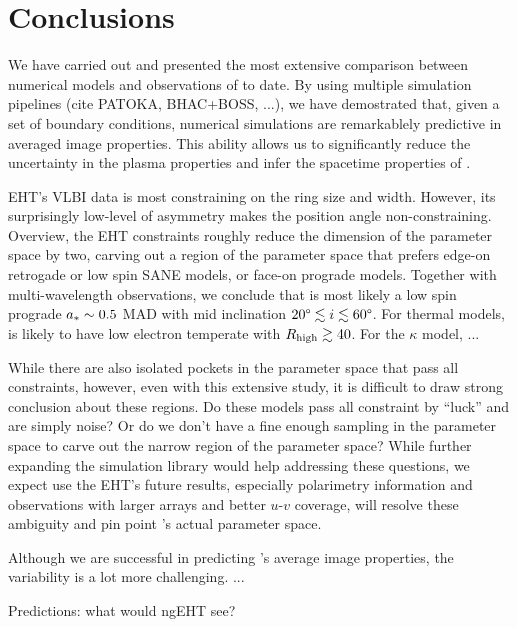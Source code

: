 \section{Conclusions}\label{sec:conclusions}


We have carried out and presented the most extensive comparison
between numerical models and observations of \sgra to date.
By using multiple simulation pipelines (cite PATOKA, BHAC+BOSS, ...),
we have demostrated that, given a set of boundary conditions,
numerical simulations are remarkablely predictive in averaged image
properties.
This ability allows us to significantly reduce the uncertainty in the
plasma properties and infer the spacetime properties of \sgra.

EHT's VLBI data is most constraining on the ring size and width.
However, its surprisingly low-level of asymmetry makes the position
angle non-constraining.
Overview, the EHT constraints roughly reduce the dimension of the
parameter space by two, carving out a region of the parameter space
that prefers edge-on retrogade or low spin SANE models, or face-on
prograde models.
Together with multi-wavelength observations, we conclude that \sgra is
most likely a low spin prograde $a_* \sim 0.5$ MAD with mid
inclination $20\degree \lesssim i \lesssim 60\degree$.
For thermal models, \sgra is likely to have low electron temperate
with $R_\mathrm{high} \gtrsim 40$.
For the $\kappa$ model, ...

While there are also isolated pockets in the parameter space that pass
all constraints, however, even with this extensive study, it is
difficult to draw strong conclusion about these regions.
Do these models pass all constraint by ``luck'' and are simply noise?
Or do we don't have a fine enough sampling in the parameter space to
carve out the narrow region of the parameter space?
While further expanding the simulation library would help addressing
these questions, we expect use the EHT's future results, especially
polarimetry information and observations with larger arrays and better
$u$-$v$ coverage, will resolve these ambiguity and pin point \sgra's
actual parameter space.

Although we are successful in predicting \sgra's average image
properties, the variability is a lot more challenging.
...
 

Predictions: what would ngEHT see?
